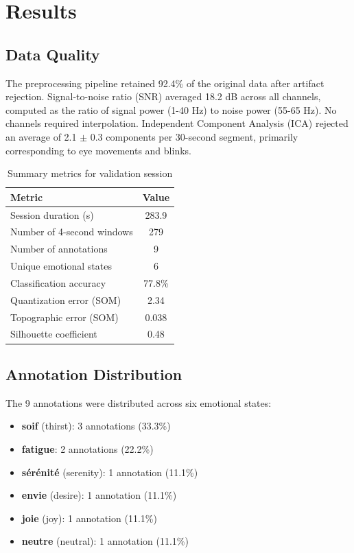 \section{Results}

\subsection{Data Quality}

The preprocessing pipeline retained 92.4\% of the original data after artifact rejection. Signal-to-noise ratio (SNR) averaged 18.2 dB across all channels, computed as the ratio of signal power (1-40 Hz) to noise power (55-65 Hz). No channels required interpolation. Independent Component Analysis (ICA) rejected an average of 2.1 $\pm$ 0.3 components per 30-second segment, primarily corresponding to eye movements and blinks.

\begin{table}[H]
\centering
\caption{Summary metrics for validation session}
\label{tab:summary}
\begin{tabular}{@{}lc@{}}
\toprule
\textbf{Metric} & \textbf{Value} \\
\midrule
Session duration (s) & 283.9 \\
Number of 4-second windows & 279 \\
Number of annotations & 9 \\
Unique emotional states & 6 \\
Classification accuracy & 77.8\% \\
Quantization error (SOM) & 2.34 \\
Topographic error (SOM) & 0.038 \\
Silhouette coefficient & 0.48 \\
\bottomrule
\end{tabular}
\end{table}

\subsection{Annotation Distribution}

The 9 annotations were distributed across six emotional states:

\begin{itemize}
    \item \textbf{soif} (thirst): 3 annotations (33.3\%)
    \item \textbf{fatigue}: 2 annotations (22.2\%)
    \item \textbf{sérénité} (serenity): 1 annotation (11.1\%)
    \item \textbf{envie} (desire): 1 annotation (11.1\%)
    \item \textbf{joie} (joy): 1 annotation (11.1\%)
    \item \textbf{neutre} (neutral): 1 annotation (11.1\%)
\end{itemize}

